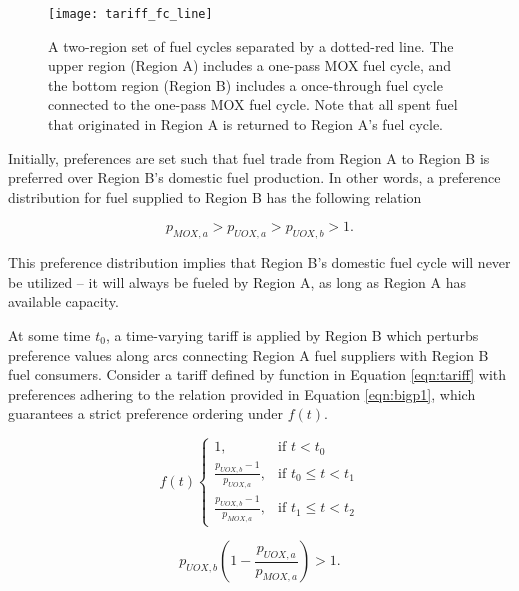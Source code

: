 \begin{figure}
  \begin{center}
    \texttt{[image: tariff\_fc\_line]}
    \caption[]{
      \label{fig:region}
      A two-region set of fuel cycles separated by a dotted-red line. The upper
      region (Region A) includes a one-pass MOX fuel cycle, and the bottom
      region (Region B) includes a once-through fuel cycle connected to the
      one-pass MOX fuel cycle. Note that all spent fuel that originated in
      Region A is returned to Region A's fuel cycle.}
  \end{center}
\end{figure}

Initially, preferences are set such that fuel trade from Region A to
Region B is preferred over Region B's domestic fuel production. In other words, a
preference distribution for fuel supplied to Region B has the following
relation

\begin{equation}\label{eqn:bigdefault}
  p_{MOX, a} > p_{UOX, a} > p_{UOX, b} > 1.
\end{equation}

\noindent
This preference distribution implies that Region B's domestic fuel cycle will
never be utilized -- it will always be fueled by Region A, as long as Region A
has available capacity. 

At some time $t_0$, a time-varying tariff is applied by Region B which perturbs
preference values along arcs connecting Region A fuel suppliers with Region B
fuel consumers. Consider a tariff defined by function in Equation
\ref{eqn:tariff} with preferences adhering to the relation provided in Equation
\ref{eqn:bigp1}, which guarantees a strict preference ordering under $f(t)$.

\begin{equation}\label{eqn:tariff}
f(t)
\begin{cases}
1, & \text{if } t < t_0 \\
\frac{p_{UOX, b} - 1}{p_{UOX, a}}, & \text{if } t_0 \leq t < t_1 \\
\frac{p_{UOX, b} - 1}{p_{MOX, a}}, & \text{if } t_1 \leq t < t_2
\end{cases} 
\end{equation}

\begin{equation}\label{eqn:bigp1}
  p_{UOX, b} \left( 1 - \frac{p_{UOX, a}}{p_{MOX, a}} \right) > 1.
\end{equation}

